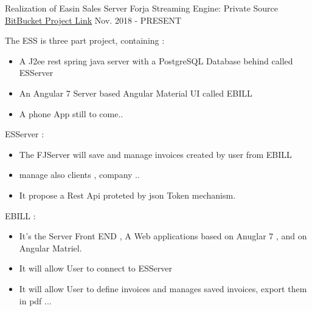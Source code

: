 \documentclass[11pt, a4paper]{awesome-cv} %
\begin{document}
\begin{cventries}
    \cventry
    {Realization of Easin Sales Server } %
    { Forja Streaming Engine: Private Source} %
    { \href{https://bitbucket.org/easysoftin/workspace/projects/EAS}{BitBucket Project Link} }%
    {Nov. 2018 - PRESENT} %
    { %
        \begin{cvitems}
            \item {The ESS is three part project, containing :}
            \begin{itemize}
                \item { A J2ee rest spring java server with a PostgreSQL Database behind called ESServer}
                \item { An Angular 7 Server based Angular Material UI called EBILL }
                \item { A phone App still to come..}
            \end{itemize}
            \item {  ESServer : }
            \begin{itemize}
                \item{ The FJServer will save and manage invoices created by user from EBILL}
                \item{ manage also clients , company ..}
                \item{ It propose a Rest Api proteted by json Token mechanism.}
            \end{itemize}
            \item {EBILL :}
            \begin{itemize}
                \item {It's the Server Front END , A Web applications based on Anuglar 7 , and on Angular Matriel.}
                \item { It will allow User to connect to ESServer}
                \item { It will allow User to define invoices and manages saved invoices, export them in pdf ...}
            \end{itemize}
        \end{cvitems}
    }



\end{cventries}
\end{document}
